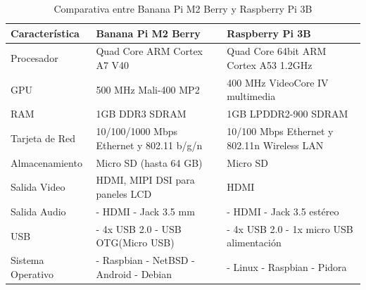 \pagebreak
\begin{longtable}{|M{3.0cm}|M{4.5cm}|M{4.5cm}|}
    \caption{Comparativa entre Banana Pi M2 Berry y Raspberry Pi 3B}
	\hline
	\textbf{Característica} & \textbf{Banana Pi M2 Berry} & \textbf{Raspberry Pi 3B} \\ 
	\hline
 	Procesador & Quad Core ARM Cortex A7 V40 & Quad Core 64bit ARM Cortex A53 1.2GHz \\
 	\hline
    GPU & 500 MHz Mali-400 MP2 & 400 MHz VideoCore IV multimedia\\
    \hline
    RAM & 1GB DDR3 SDRAM & 1GB LPDDR2-900 SDRAM \\
	\hline
	Tarjeta de Red & 10/100/1000 Mbps Ethernet y 802.11 b/g/n & 10/100 Mbps Ethernet y 802.11n Wireless LAN\\
	\hline
	Almacenamiento & Micro SD (hasta 64 GB) & Micro SD\\
	\hline
	Salida Video & HDMI, MIPI DSI para paneles LCD & HDMI\\
    \hline
    Salida Audio 
    & 
    \newline - HDMI 
    \newline - Jack 3.5 mm 
    & 
    \newline - HDMI
    \newline - Jack 3.5 estéreo \\
    \hline
    USB & 
    \newline - 4x USB 2.0 
    \newline - USB OTG(Micro USB) 
    & 
    \newline - 4x USB 2.0
    \newline - 1x micro USB alimentación \\
    \hline
    Sistema Operativo 
    & 
    \newline - Raspbian
    \newline - NetBSD
    \newline - Android
    \newline - Debian 
    &
    \newline - Linux
    \newline - Raspbian
    \newline - Pidora \\
    \hline
	
\end{longtable}



